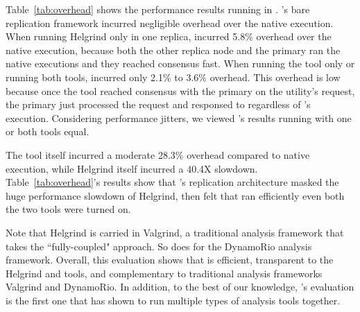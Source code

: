 Table~\ref{tab:overhead} shows the performance results running \clamav in 
\xxx. \xxx's bare replication framework incurred negligible overhead over 
the native execution. When running Helgrind only in one 
replica, \xxx incurred 5.8\% overhead over the native execution, because both 
the other replica node and the primary ran the native executions and they 
reached consensus fast. When running the \drcov tool only or running both 
tools, \xxx incurred only 2.1\% to 3.6\% overhead. This overhead is low because once the \drcov tool 
reached consensus with the primary on the \clamdscan utility's request, the 
primary just processed the request and responsed to \clamdscan regardless of 
\drcov's execution. Considering performance jitters, we viewed \xxx's 
results running with one or both tools equal.

The \drcov tool itself incurred a moderate 28.3\% overhead compared to native 
execution, while Helgrind itself incurred a 40.4X slowdown. 
Table~\ref{tab:overhead}'s results show that \xxx's replication architecture 
masked the huge performance slowdown of Helgrind, then \clamdscan felt that 
\clamav ran efficiently even both the two tools were turned on.

Note that Helgrind is carried in Valgrind, a traditional analysis 
framework that takes the ``fully-coupled" approach. So does \drcov for the 
DynamoRio analysis framework. Overall, this evaluation shows that \xxx is 
efficient, transparent to the 
Helgrind and \drcov tools, and complementary to traditional analysis frameworks 
Valgrind and DynamoRio. In addition, to the best of our knowledge, \xxx's 
evaluation is the first one that has shown to run multiple types of analysis 
tools together.
